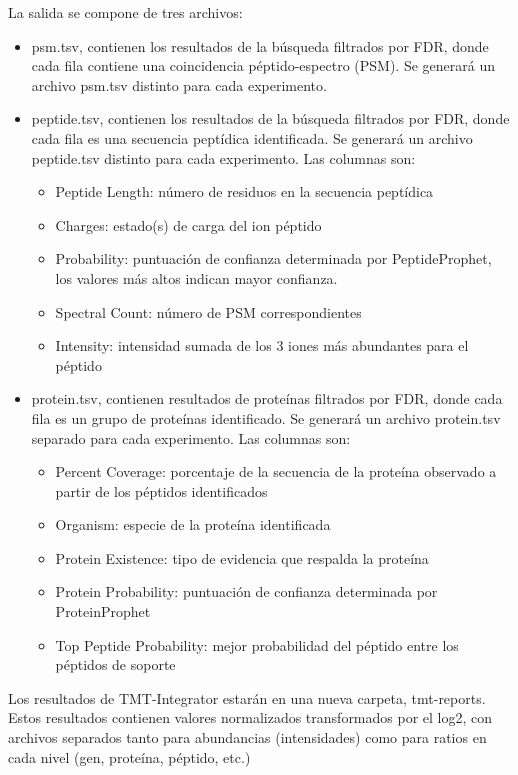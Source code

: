 \documentclass[nochap]{config/ejercicios}
\begin{document}
La salida se compone de tres archivos:
\begin{itemize}
\item psm.tsv, contienen los resultados de la búsqueda filtrados por FDR, donde cada fila contiene una coincidencia péptido-espectro (PSM). Se generará un archivo psm.tsv distinto para cada experimento.
\item peptide.tsv, contienen los resultados de la búsqueda filtrados por FDR, donde cada fila es una secuencia peptídica identificada. Se generará un archivo peptide.tsv distinto para cada experimento. Las columnas son:
\begin{itemize}
\item Peptide Length: número de residuos en la secuencia peptídica
\item Charges: estado(s) de carga del ion péptido
\item Probability: puntuación de confianza determinada por PeptideProphet, los valores más altos indican mayor confianza.
\item Spectral Count: número de PSM correspondientes
\item Intensity: intensidad sumada de los 3 iones más abundantes para el péptido
\end{itemize}
\item protein.tsv, contienen resultados de proteínas filtrados por FDR, donde cada fila es un grupo
de proteínas identificado. Se generará un archivo protein.tsv separado para cada experimento. Las columnas son:
\begin{itemize}
\item Percent Coverage: porcentaje de la secuencia de la proteína observado a partir de los péptidos identificados
\item Organism: especie de la proteína identificada
\item Protein Existence: tipo de evidencia que respalda la proteína
\item Protein Probability: puntuación de confianza determinada por ProteinProphet
\item Top Peptide Probability: mejor probabilidad del péptido entre los péptidos de soporte
\end{itemize}
\end{itemize}

Los resultados de TMT-Integrator estarán en una nueva carpeta, tmt-reports. Estos resultados contienen valores normalizados transformados por el log2, con archivos separados tanto para abundancias (intensidades) como para ratios en cada nivel (gen, proteína, péptido, etc.)
\end{document}
